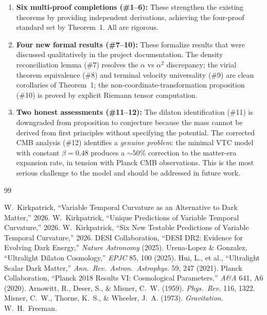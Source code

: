 \documentclass[11pt,a4paper]{article}
\theoremstyle{definition}
\begin{document}
\begin{enumerate}
    \item \textbf{Six multi-proof completions (\#1--6):} These strengthen the existing theorems by providing independent derivations, achieving the four-proof standard set by Theorem~1. All are rigorous.
    \item \textbf{Four new formal results (\#7--10):} These formalize results that were discussed qualitatively in the project documentation. The density reconciliation lemma (\#7) resolves the $\alpha$ vs $\alpha^2$ discrepancy; the virial theorem equivalence (\#8) and terminal velocity universality (\#9) are clean corollaries of Theorem~1; the non-coordinate-transformation proposition (\#10) is proved by explicit Riemann tensor computation.
    \item \textbf{Two honest assessments (\#11--12):} The dilaton identification (\#11) is downgraded from proposition to conjecture because the mass cannot be derived from first principles without specifying the potential. The corrected CMB analysis (\#12) identifies a \textit{genuine problem}: the minimal VTC model with constant $\beta = 0.48$ produces a $\sim 50\%$ correction to the matter-era expansion rate, in tension with Planck CMB observations. This is the most serious challenge to the model and should be addressed in future work.
\end{enumerate}

\begin{thebibliography}{99}

 W.~Kirkpatrick, ``Variable Temporal Curvature as an Alternative to Dark Matter,'' 2026.
 W.~Kirkpatrick, ``Unique Predictions of Variable Temporal Curvature,'' 2026.
 W.~Kirkpatrick, ``Six New Testable Predictions of Variable Temporal Curvature,'' 2026.
 DESI Collaboration, ``DESI DR2: Evidence for Evolving Dark Energy,'' \textit{Nature Astronomy} (2025).
 Urena-Lopez \& Gonzalez, ``Ultralight Dilaton Cosmology,'' \textit{EPJC} 85, 100 (2025).
 Hui, L., et al., ``Ultralight Scalar Dark Matter,'' \textit{Ann.~Rev.~Astron.~Astrophys.} 59, 247 (2021).
 Planck Collaboration, ``Planck 2018 Results VI: Cosmological Parameters,'' \textit{A\&A} 641, A6 (2020).
 Arnowitt, R., Deser, S., \& Misner, C.~W. (1959). \textit{Phys.~Rev.} 116, 1322.
 Misner, C.~W., Thorne, K.~S., \& Wheeler, J.~A. (1973). \textit{Gravitation.} W.~H.~Freeman.

\end{thebibliography}
\end{document}
